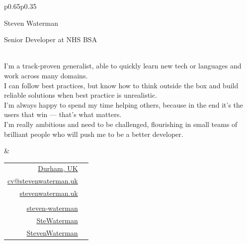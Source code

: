 \documentclass[hidelinks, 12pt, a4paper]{article}
\begin{document}
	\begin{tabular}{p{0.65\textwidth}p{0.35\textwidth}}
		\begin{minipage}{\linewidth}
			\begin{Huge}Steven Waterman\end{Huge}
			
			\hspace{24pt}\begin{large}Senior Developer at NHS BSA\end{large}\\
			
			I'm a track-proven generalist, able to quickly learn new tech or languages and work across many domains.\\
			
			I can follow best practices, but know how to think outside the box and build reliable solutions when best practice is unrealistic.\\
			
			I'm always happy to spend my time helping others, because in the end it's the users that win --- that's what matters.\\
			
			I'm really ambitious and need to be challenged, flourishing in small teams of brilliant people who will push me to be a better developer.
		\end{minipage} & \vspace{-40pt}\begin{minipage}{\linewidth}
			\begin{flushright}
				\begin{tabular}{rc}
					\href{https://en.wikipedia.org/wiki/Durham,_England}{Durham, UK} & \href{https://en.wikipedia.org/wiki/Durham,_England}{\faHome} \\
					\href{mailto:cv@stevenwaterman.uk}{cv@stevenwaterman.uk} & \href{mailto:cv@stevenwaterman.uk}{\faEnvelope} \\
					\href{http://www.stevenwaterman.uk}{stevenwaterman.uk} & \href{http://www.stevenwaterman.uk}{\faLink} \\
					&\\
					\href{https://www.linkedin.com/in/steven-waterman/}{steven-waterman} & \href{https://www.linkedin.com/in/steven-waterman/}{\faLinkedin} \\
					\href{https://twitter.com/SteWaterman}{SteWaterman} & \href{https://twitter.com/SteWaterman}{\faTwitter} \\
					\href{https://github.com/stevenwaterman}{StevenWaterman} & \href{https://github.com/stevenwaterman}{\faGithub}
				\end{tabular}
			\end{flushright}
		\end{minipage}
	\end{tabular}
\end{document}
